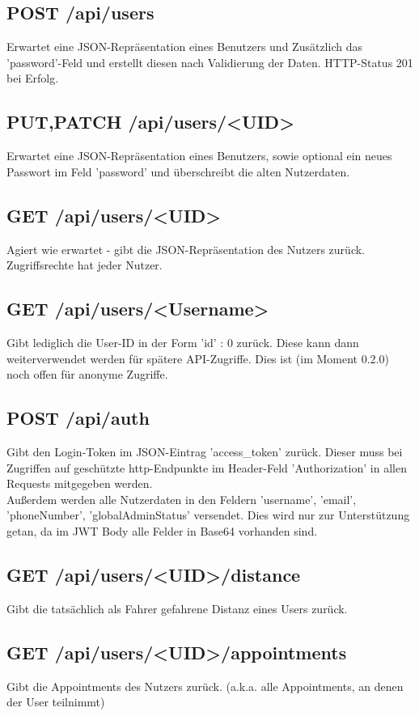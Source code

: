 \documentclass[11pt,a4paper]{article}
\begin{document}
\subsection{\textbf{POST} /api/users}
Erwartet eine JSON-Repräsentation eines Benutzers und Zusätzlich das 'password'-Feld und erstellt diesen nach Validierung der Daten. HTTP-Status 201 bei Erfolg.
\subsection{\textbf{PUT,PATCH} /api/users/<UID>}
Erwartet eine JSON-Repräsentation eines Benutzers, sowie optional ein neues Passwort im Feld 'password' und überschreibt die alten Nutzerdaten.
\subsection{\textbf{GET} /api/users/<UID>}
Agiert wie erwartet - gibt die JSON-Repräsentation des Nutzers zurück. Zugriffsrechte hat jeder Nutzer.
\subsection{\textbf{GET} /api/users/<Username>}
Gibt lediglich die User-ID in der Form {'id' : 0} zurück. Diese kann dann weiterverwendet werden für spätere API-Zugriffe. Dies ist (im Moment 0.2.0) noch offen für anonyme Zugriffe.
\subsection{\textbf{POST} /api/auth}
Gibt den Login-Token im JSON-Eintrag 'access\_token' zurück. Dieser muss bei Zugriffen auf geschützte http-Endpunkte im Header-Feld 'Authorization' in allen Requests mitgegeben werden.\\
Außerdem werden alle Nutzerdaten in den Feldern 'username', 'email', 'phoneNumber', 'globalAdminStatus' versendet. Dies wird nur zur Unterstützung getan, da im JWT Body alle Felder in Base64 vorhanden sind.
\subsection{\textbf{GET} /api/users/<UID>/distance}
Gibt die tatsächlich als Fahrer gefahrene Distanz eines Users zurück.
\subsection{\textbf{GET} /api/users/<UID>/appointments}
Gibt die Appointments des Nutzers zurück. (a.k.a. alle Appointments, an denen der User teilnimmt)
\end{document}
